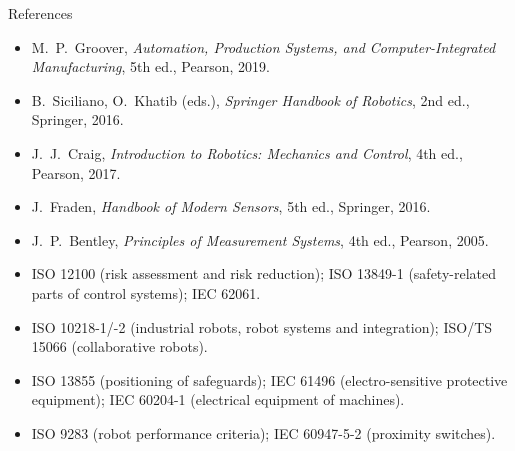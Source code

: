 \documentclass[aspectratio=169,10pt]{beamer}
\begin{document}
\begin{frame}{References}
\scriptsize
\begin{itemize}
\item M.~P.~Groover, \emph{Automation, Production Systems, and Computer-Integrated Manufacturing}, 5th ed., Pearson, 2019.
\item B.~Siciliano, O.~Khatib (eds.), \emph{Springer Handbook of Robotics}, 2nd ed., Springer, 2016.
\item J.~J.~Craig, \emph{Introduction to Robotics: Mechanics and Control}, 4th ed., Pearson, 2017.
\item J.~Fraden, \emph{Handbook of Modern Sensors}, 5th ed., Springer, 2016.
\item J.~P.~Bentley, \emph{Principles of Measurement Systems}, 4th ed., Pearson, 2005.
\item ISO 12100 (risk assessment and risk reduction); ISO 13849-1 (safety-related parts of control systems); IEC 62061.
\item ISO 10218-1/-2 (industrial robots, robot systems and integration); ISO/TS 15066 (collaborative robots).
\item ISO 13855 (positioning of safeguards); IEC 61496 (electro-sensitive protective equipment); IEC 60204-1 (electrical equipment of machines).
\item ISO 9283 (robot performance criteria); IEC 60947-5-2 (proximity switches).
\end{itemize}
\end{frame}
\end{document}

